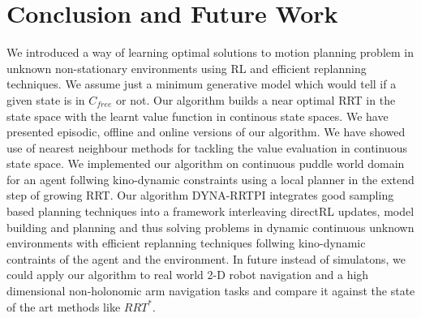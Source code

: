 \documentclass[MTech]{iitmdiss}
\begin{document}
\chapter{Conclusion and Future Work}
We introduced a way of learning optimal solutions to motion planning problem in unknown non-stationary environments using RL and efficient replanning techniques. We assume just a minimum generative model which would tell if a given state is in $C_{free}$ or not. Our algorithm builds a near optimal RRT in the state space with the learnt value function in continous state spaces. We have presented episodic, offline and online versions of our algorithm. We have showed use of nearest neighbour methods for tackling the value evaluation in continuous state space. We implemented our algorithm on continuous puddle world domain for an agent follwing kino-dynamic constraints using a local planner in the extend step of growing RRT. Our algorithm DYNA-RRTPI integrates good sampling based planning techniques into a framework interleaving directRL updates, model building and planning and thus solving problems in dynamic continuous unknown environments with efficient replanning techniques follwing kino-dynamic contraints of the agent and the environment. In future instead of simulatons, we could apply our algorithm to real world 2-D robot navigation and a high dimensional non-holonomic arm navigation tasks and compare it against the state of the art methods like $RRT^*$. 


%
\end{document}
